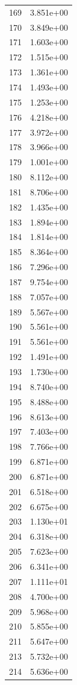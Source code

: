 \documentclass[12pt]{article}
\begin{document}
\begin{longtable}{@{}cc@{}}
169 & 3.851e+00 \\
170 & 3.849e+00 \\
171 & 1.603e+00 \\
172 & 1.515e+00 \\
173 & 1.361e+00 \\
174 & 1.493e+00 \\
175 & 1.253e+00 \\
176 & 4.218e+00 \\
177 & 3.972e+00 \\
178 & 3.966e+00 \\
179 & 1.001e+00 \\
180 & 8.112e+00 \\
181 & 8.706e+00 \\
182 & 1.435e+00 \\
183 & 1.894e+00 \\
184 & 1.814e+00 \\
185 & 8.364e+00 \\
186 & 7.296e+00 \\
187 & 9.754e+00 \\
188 & 7.057e+00 \\
189 & 5.567e+00 \\
190 & 5.561e+00 \\
191 & 5.561e+00 \\
192 & 1.491e+00 \\
193 & 1.730e+00 \\
194 & 8.740e+00 \\
195 & 8.488e+00 \\
196 & 8.613e+00 \\
197 & 7.403e+00 \\
198 & 7.766e+00 \\
199 & 6.871e+00 \\
200 & 6.871e+00 \\
201 & 6.518e+00 \\
202 & 6.675e+00 \\
203 & 1.130e+01 \\
204 & 6.318e+00 \\
205 & 7.623e+00 \\
206 & 6.341e+00 \\
207 & 1.111e+01 \\
208 & 4.700e+00 \\
209 & 5.968e+00 \\
210 & 5.855e+00 \\
211 & 5.647e+00 \\
213 & 5.732e+00 \\
214 & 5.636e+00 \\

\end{longtable}
\end{document}
